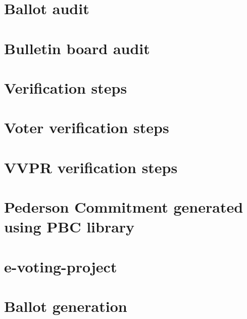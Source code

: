 \let\mypdfximage\pdfximage\def\pdfximage{\immediate\mypdfximage}\documentclass[twoside]{book}
\newcommand{\+}{\discretionary{\mbox{\scriptsize$\hookleftarrow$}}{}{}}
\begin{document}
\chapter{Ballot audit}
\label{md_include_protocol_verif_ballotaudit__r_e_a_d_m_e}

\chapter{Bulletin board audit}
\label{md_include_protocol_verif_bbaudit__r_e_a_d_m_e}

\chapter{Verification steps}
\label{md_include_protocol_verif__r_e_a_d_m_e}

\chapter{Voter verification steps}
\label{md_include_protocol_verif_votercheck__r_e_a_d_m_e}

\chapter{V\+V\+PR verification steps}
\label{md_include_protocol_verif_vvprcheck__r_e_a_d_m_e}

\chapter{Pederson Commitment generated using P\+BC library}
\label{md_include_util_pairing__r_e_a_d_m_e}

\chapter{e-\/voting-\/project}
\label{md__r_e_a_d_m_e}

\chapter{Ballot generation}
\label{md_src_protocol_ea_ballot__r_e_a_d_m_e}

\end{document}
